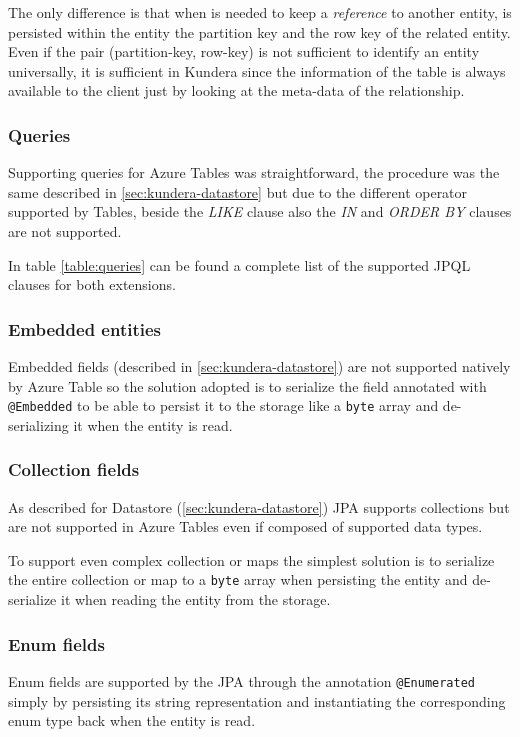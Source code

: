 \noindent The only difference is that when is needed to keep a \textit{reference} to another entity, is persisted within the entity the partition key and the row key of the related entity.
Even if the pair (partition-key, row-key) is not sufficient to identify an entity universally, it is sufficient in Kundera since the information of the table is always available to the client just by looking at the meta-data of the relationship. 

\subsubsection{Queries}
Supporting queries for Azure Tables was straightforward, the procedure was the same described in \ref{sec:kundera-datastore} but due to the different operator supported by Tables, beside the \textit{LIKE} clause also the \textit{IN} and \textit{ORDER BY} clauses are not supported.

\noindent In table \ref{table:queries} can be found a complete list of the supported JPQL clauses for both extensions.

\subsubsection{Embedded entities}
Embedded fields (described in \ref{sec:kundera-datastore}) are not supported natively by Azure Table so the solution adopted is to serialize the field annotated with \texttt{@Embedded} to be able to persist it to the storage like a \texttt{byte} array and de-serializing it when the entity is read.

\subsubsection{Collection fields}
As described for Datastore (\ref{sec:kundera-datastore}) JPA supports collections but are not supported in Azure Tables even if composed of supported data types.

\noindent To support even complex collection or maps the simplest solution is to serialize the entire collection or map to a \texttt{byte} array when persisting the entity and de-serialize it when reading the entity from the storage.

\subsubsection{Enum fields}
Enum fields are supported by the JPA through the annotation \texttt{@Enumerated}  simply by persisting its string representation and instantiating the corresponding enum type back when the entity is read.

